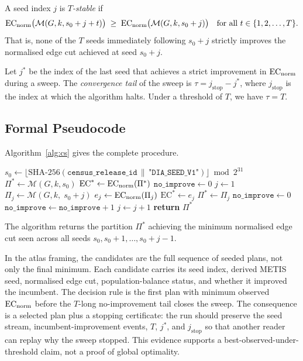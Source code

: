\begin{definition}[$T$-Stability]
\label{def:tstable}
A seed index $j$ is \emph{$T$-stable} if
\[
  \mathrm{EC}_{\mathrm{norm}}\bigl(\mathcal{M}(G, k, s_0 + j + t)\bigr)
  \;\ge\;
  \mathrm{EC}_{\mathrm{norm}}\bigl(\mathcal{M}(G, k, s_0 + j)\bigr)
  \quad
  \text{for all } t \in \{1, 2, \ldots, T\}.
\]
That is, none of the $T$ seeds immediately following $s_0 + j$ strictly
improves the normalised edge cut achieved at seed $s_0 + j$.
\end{definition}

\begin{definition}
\label{def:tail}
Let $j^*$ be the index of the last seed that achieves a strict improvement
in $\mathrm{EC}_{\mathrm{norm}}$ during a sweep.
The \emph{convergence tail} of the sweep is $\tau = j_{\mathrm{stop}} - j^*$,
where $j_{\mathrm{stop}}$ is the index at which the algorithm halts.
Under a threshold of $T$, we have $\tau = T$.
\end{definition}

\subsection{Formal Pseudocode}

Algorithm~\ref{alg:cs} gives the complete \cs{} procedure.

\begin{algorithm}[t]
\caption{}
\label{alg:cs}
\begin{algorithmic}[1]
\State $s_0 \gets \lfloor \mathrm{SHA\text{-}256}(\mathtt{census\_release\_id}
       \,\|\, \texttt{"DIA\_SEED\_V1"}) \rfloor \bmod 2^{31}$
\State $\Pi^* \gets \mathcal{M}(G, k, s_0)$
\State $\mathrm{EC}^* \gets \mathrm{EC}_{\mathrm{norm}}(\Pi^*)$
\State $\mathtt{no\_improve} \gets 0$
\State $j \gets 1$
  \State $\Pi_j \gets \mathcal{M}(G, k,\; s_0 + j)$
  \State $e_j \gets \mathrm{EC}_{\mathrm{norm}}(\Pi_j)$
    \State $\mathrm{EC}^* \gets e_j$
    \State $\Pi^* \gets \Pi_j$
    \State $\mathtt{no\_improve} \gets 0$
  \Else
    \State $\mathtt{no\_improve} \gets \mathtt{no\_improve} + 1$
  \EndIf
  \State $j \gets j + 1$
\EndWhile
\State \textbf{return} $\Pi^*$
\end{algorithmic}
\end{algorithm}

The algorithm returns the partition $\Pi^*$ achieving the minimum normalised
edge cut seen across all seeds $s_0, s_0+1, \ldots, s_0 + j - 1$.

In the atlas framing, the candidates are the full sequence of seeded plans,
not only the final minimum.
Each candidate carries its seed index, derived METIS seed, normalised edge cut,
population-balance status, and whether it improved the incumbent.
The decision rule is the first plan with minimum observed $\mathrm{EC}_{\mathrm{norm}}$ before the
$T$-long no-improvement tail closes the sweep.
The consequence is a selected plan plus a stopping certificate: the run should
preserve the seed stream, incumbent-improvement events, $T$, $j^*$, and
$j_{\mathrm{stop}}$ so that another reader can replay why the sweep stopped.
This evidence supports a best-observed-under-threshold claim, not a proof of
global optimality.

